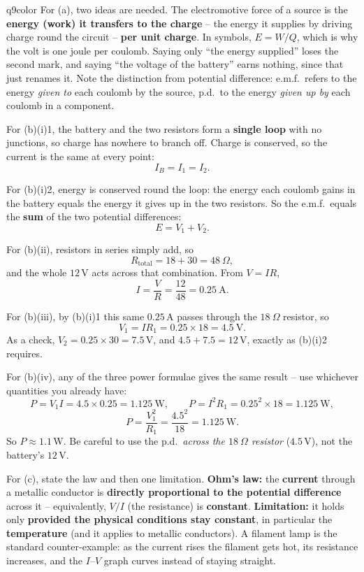 \documentclass[11pt,a4paper]{article}
\begin{document}
\begin{ansbox}{q9color}
For (a), two ideas are needed. The electromotive force of a source is the \textbf{energy (work) it transfers to the charge} -- the energy it supplies by driving charge round the circuit -- \textbf{per unit charge}. In symbols, $E = W/Q$, which is why the volt is one joule per coulomb. Saying only ``the energy supplied'' loses the second mark, and saying ``the voltage of the battery'' earns nothing, since that just renames it. Note the distinction from potential difference: e.m.f.\ refers to the energy \emph{given to} each coulomb by the source, p.d.\ to the energy \emph{given up by} each coulomb in a component.

For (b)(i)1, the battery and the two resistors form a \textbf{single loop} with no junctions, so charge has nowhere to branch off. Charge is conserved, so the current is the same at every point:
\[ I_B = I_1 = I_2. \]

For (b)(i)2, energy is conserved round the loop: the energy each coulomb gains in the battery equals the energy it gives up in the two resistors. So the e.m.f.\ equals the \textbf{sum} of the two potential differences:
\[ E = V_1 + V_2. \]

For (b)(ii), resistors in series simply add, so
\[ R_{\text{total}} = 18 + 30 = 48\ \Omega, \]
and the whole $12$\,V acts across that combination. From $V = IR$,
\[ I = \frac{V}{R} = \frac{12}{48} = 0.25\ \mathrm{A}. \]

For (b)(iii), by (b)(i)1 this same $0.25$\,A passes through the $18\ \Omega$ resistor, so
\[ V_1 = I R_1 = 0.25 \times 18 = 4.5\ \mathrm{V}. \]
As a check, $V_2 = 0.25 \times 30 = 7.5$\,V, and $4.5 + 7.5 = 12$\,V, exactly as (b)(i)2 requires.

For (b)(iv), any of the three power formulae gives the same result -- use whichever quantities you already have:
\[ P = V_1 I = 4.5 \times 0.25 = 1.125\ \mathrm{W}, \qquad P = I^2 R_1 = 0.25^2 \times 18 = 1.125\ \mathrm{W}, \]
\[ P = \frac{V_1^2}{R_1} = \frac{4.5^2}{18} = 1.125\ \mathrm{W}. \]
So $P \approx 1.1$\,W. Be careful to use the p.d.\ \emph{across the $18\ \Omega$ resistor} ($4.5$\,V), not the battery's $12$\,V.

For (c), state the law and then one limitation. \textbf{Ohm's law:} the \textbf{current} through a metallic conductor is \textbf{directly proportional to the potential difference} across it -- equivalently, $V/I$ (the resistance) is \textbf{constant}. \textbf{Limitation:} it holds only \textbf{provided the physical conditions stay constant}, in particular the \textbf{temperature} (and it applies to metallic conductors). A filament lamp is the standard counter-example: as the current rises the filament gets hot, its resistance increases, and the $I$--$V$ graph curves instead of staying straight.


\end{ansbox}
\end{document}
